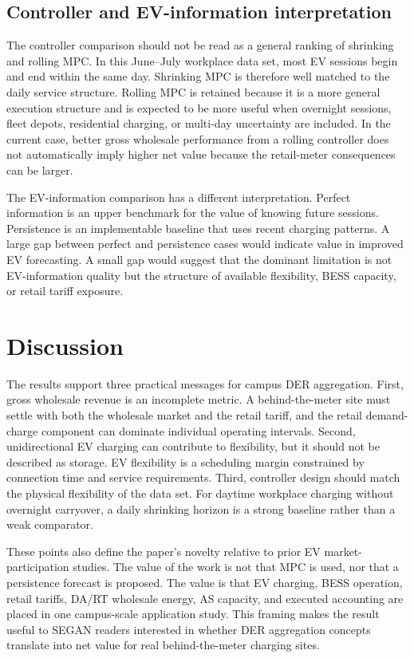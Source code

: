\documentclass[final,5p,times]{elsarticle}
\begin{document}
\subsection{Controller and EV-information interpretation}
The controller comparison should not be read as a general ranking of shrinking and rolling MPC. In this June--July workplace data set, most EV sessions begin and end within the same day. Shrinking MPC is therefore well matched to the daily service structure. Rolling MPC is retained because it is a more general execution structure and is expected to be more useful when overnight sessions, fleet depots, residential charging, or multi-day uncertainty are included. In the current case, better gross wholesale performance from a rolling controller does not automatically imply higher net value because the retail-meter consequences can be larger.

The EV-information comparison has a different interpretation. Perfect information is an upper benchmark for the value of knowing future sessions. Persistence is an implementable baseline that uses recent charging patterns. A large gap between perfect and persistence cases would indicate value in improved EV forecasting. A small gap would suggest that the dominant limitation is not EV-information quality but the structure of available flexibility, BESS capacity, or retail tariff exposure.

\section{Discussion}
\label{sec:discussion}

The results support three practical messages for campus DER aggregation. First, gross wholesale revenue is an incomplete metric. A behind-the-meter site must settle with both the wholesale market and the retail tariff, and the retail demand-charge component can dominate individual operating intervals. Second, unidirectional EV charging can contribute to flexibility, but it should not be described as storage. EV flexibility is a scheduling margin constrained by connection time and service requirements. Third, controller design should match the physical flexibility of the data set. For daytime workplace charging without overnight carryover, a daily shrinking horizon is a strong baseline rather than a weak comparator.

These points also define the paper's novelty relative to prior EV market-participation studies. The value of the work is not that MPC is used, nor that a persistence forecast is proposed. The value is that EV charging, BESS operation, retail tariffs, DA/RT wholesale energy, AS capacity, and executed accounting are placed in one campus-scale application study. This framing makes the result useful to SEGAN readers interested in whether DER aggregation concepts translate into net value for real behind-the-meter charging sites.
\end{document}
